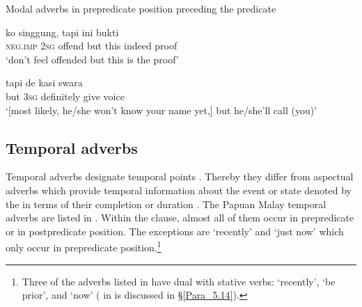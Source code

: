 \begin{styleExampleTitle}
Modal adverbs in prepredicate position preceding the predicate
\end{styleExampleTitle}

\ea
\label{Example_5.161}
 {ko} {singgung,} {tapi} {ini} {} {bukti}\\ %
 \textsc{neg.imp}  \textsc{2sg}  offend  but  this  indeed  proof\\
 ‘don’t feel offended but this is  the proof’ \textstyleExampleSource{[081011-024-Cv.0150]}
\z

\ea
\label{Example_5.162}
\gll {{\ldots}} {tapi} {de} {} {kasi} {swara}\\ %
 { }  but  \textsc{3sg}  definitely  give  voice\\
 ‘[most likely, he/she won’t know your name yet,] but he/she’ll  call (you)’ \textstyleExampleSource{[080919-004-NP.0078]}
\z


\subsection{Temporal adverbs}
\label{Para_5.4.5}
Temporal adverbs designate temporal points \citep[91–92]{Givon.2001}. Thereby they differ from aspectual adverbs which provide temporal information about the event or state denoted by the  in terms of their completion or duration \citep[5094]{Asher.1994}. The Papuan Malay temporal adverbs are listed in . Within the clause, almost all of them occur in prepredicate or in postpredicate position. The exceptions are  ‘recently’ and  ‘just now’ which only occur in prepredicate position.\footnote{Three of the adverbs listed in    have dual  with  stative verbs:  ‘recently’,  ‘be prior’, and  ‘now’ ( in  is discussed in §\ref{Para_5.14}).}


